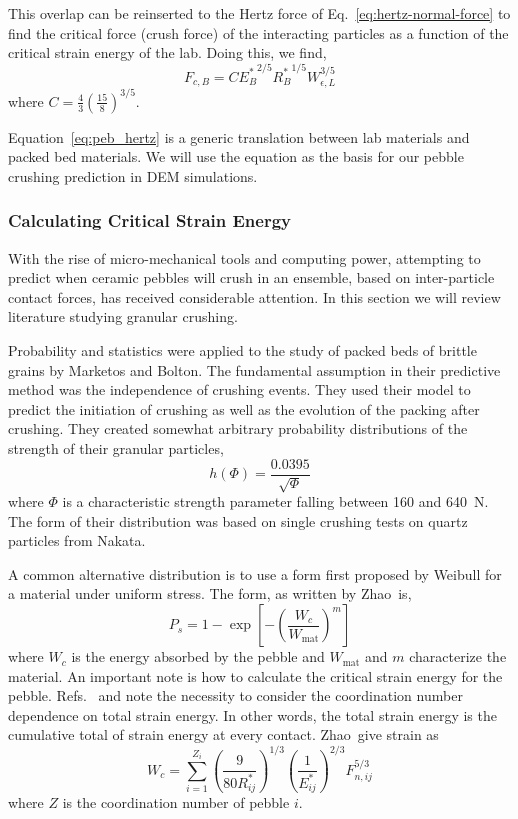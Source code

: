 This overlap can be reinserted to the Hertz force of Eq.~\ref{eq:hertz-normal-force} to find the critical force (crush force) of the interacting particles as a function of the critical strain energy of the lab. Doing this, we find,
\begin{equation}\label{eq:peb_hertz}
	F_{c,B} = C{E_B^*}^{2/5}{R_B^*}^{1/5}W_{\epsilon,L}^{3/5}
\end{equation}
where $C = \frac{4}{3}\left(\frac{15}{8}\right)^{3/5}$.

Equation~\ref{eq:peb_hertz} is a generic translation between lab materials and packed bed materials. We will use the equation as the basis for our pebble crushing prediction in DEM simulations.





\subsubsection{Calculating Critical Strain Energy}
With the rise of micro-mechanical tools and computing power, attempting to predict when ceramic pebbles will crush in an ensemble, based on inter-particle contact forces, has received considerable attention. In this section we will review literature studying granular crushing.

Probability and statistics were applied to the study of packed beds of brittle grains by Marketos and Bolton\cite{Marketos2007}. The fundamental assumption in their predictive method was the independence of crushing events. They used their model to predict the initiation of crushing as well as the evolution of the packing after crushing. They created somewhat arbitrary probability distributions of the strength of their granular particles,
\begin{equation}
	h(\Phi) = \frac{0.0395}{\sqrt{\Phi}}
\end{equation}
where $\Phi$ is a characteristic strength parameter falling between 160 and 640~N. The form of their distribution was based on single crushing tests on quartz particles from Nakata\etal.

A common alternative distribution is to use a form first proposed by Weibull for a material under uniform stress\cite{Kwok2013,Zhao2011,nakata1999probabilistic,Zhao2013,Pitchumani2004}. The form, as written by Zhao\etal~is,
\begin{equation}
	P_s = 1 - \exp\left[-\left(\frac{W_c}{W_\text{mat}}\right)^m\right]
\end{equation}
where $W_c$ is the energy absorbed by the pebble and $W_\text{mat}$ and $m$ characterize the material. An important note is how to calculate the critical strain energy for the pebble. Refs.~\cite{Marketos2007} and \cite{Zhao2011} note the necessity to consider the coordination number dependence on total strain energy. In other words, the total strain energy is the cumulative total of strain energy at every contact. Zhao\etal~give strain as
\begin{equation}
	W_c = \sum_{i=1}^{Z_i}\left(\frac{9}{80 R_{ij}^*}\right)^{1/3} \left(\frac{1}{E_{ij}^*}\right)^{2/3} F_{n,ij}^{5/3}
\end{equation}
where $Z$ is the coordination number of pebble $i$. 

